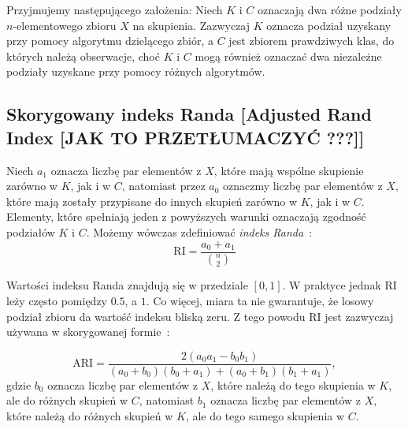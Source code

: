 \documentclass{praca1}
\begin{document}
Przyjmujemy następującego założenia: Niech $K$ i $C$ oznaczają dwa różne podziały $n$-elementowego zbioru $X$ na skupienia. Zazwyczaj $K$ oznacza podział uzyskany przy pomocy algorytmu dzielącego zbiór, a $C$ jest zbiorem prawdziwych klas, do których należą obserwacje, choć $K$ i $C$ mogą również oznaczać dwa niezależne podziały uzyskane przy pomocy różnych algorytmów.

\subsection{Skorygowany indeks Randa [Adjusted Rand Index [JAK TO PRZETŁUMACZYĆ ???]]}

Niech $a_1$ oznacza liczbę par elementów z $X$, które mają wspólne skupienie zarówno w $K$, jak i w $C$, natomiast przez $a_0$ oznaczmy liczbę par elementów z $X$, które mają zostały przypisane do innych skupień zarówno w $K$, jak i w $C$. Elementy, które spełniają jeden z powyższych warunki oznaczają zgodność podziałów $K$ i $C$. Możemy wówczas zdefiniować \emph{indeks Randa}~\cite{Rand1971:objective}:
\begin{equation}
\textrm{RI} = \frac{a_0+a_1}{{n \choose 2} }
\end{equation}

Wartości indeksu Randa znajdują się w przedziale $[0,1]$. W praktyce jednak $\textrm{RI}$ leży często pomiędzy $0.5$, a $1$. Co więcej, miara ta nie gwarantuje, że losowy podział zbioru da wartość indeksu bliską zeru. Z tego powodu $\textrm{RI}$ jest zazwyczaj używana w skorygowanej formie~\cite{Lawrence1985:comparing}:

\begin{equation}
\textrm{ARI} = \frac{2 (a_0 a_1 - b_0 b_1) }{(a_0 + b_0)(b_0 + a_1) + (a_0 + b_1)(b_1 + a_1)},
\end{equation}
gdzie $b_0$ oznacza liczbę par elementów z $X$, które należą do tego skupienia w $K$, ale do różnych skupień w $C$, natomiast $b_1$ oznacza liczbę par elementów z $X$, które należą do różnych skupień w $K$, ale do tego samego skupienia w $C$.



\end{document}
